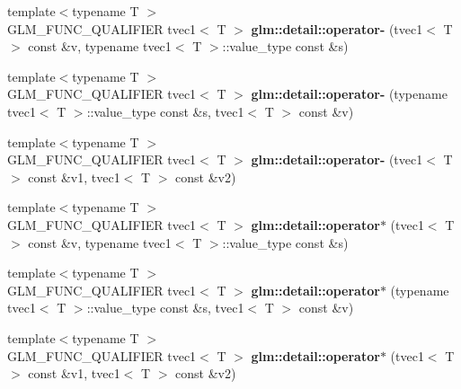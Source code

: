 \begin{DoxyCompactItemize}
\item 
\hypertarget{namespaceglm_1_1detail_a0218e4cee708b6b91e48baa5bbea5954}{{\footnotesize template$<$typename T $>$ }\\\-G\-L\-M\-\_\-\-F\-U\-N\-C\-\_\-\-Q\-U\-A\-L\-I\-F\-I\-E\-R tvec1$<$ \-T $>$ {\bfseries glm\-::detail\-::operator-\/} (tvec1$<$ \-T $>$ const \&v, typename tvec1$<$ \-T $>$\-::value\-\_\-type const \&s)}\label{namespaceglm_1_1detail_a0218e4cee708b6b91e48baa5bbea5954}

\item 
\hypertarget{namespaceglm_1_1detail_abfb3bb0f7c5149426afe27f823a7d7fa}{{\footnotesize template$<$typename T $>$ }\\\-G\-L\-M\-\_\-\-F\-U\-N\-C\-\_\-\-Q\-U\-A\-L\-I\-F\-I\-E\-R tvec1$<$ \-T $>$ {\bfseries glm\-::detail\-::operator-\/} (typename tvec1$<$ \-T $>$\-::value\-\_\-type const \&s, tvec1$<$ \-T $>$ const \&v)}\label{namespaceglm_1_1detail_abfb3bb0f7c5149426afe27f823a7d7fa}

\item 
\hypertarget{namespaceglm_1_1detail_a3343759099fcd3eda38f3faf618aeca8}{{\footnotesize template$<$typename T $>$ }\\\-G\-L\-M\-\_\-\-F\-U\-N\-C\-\_\-\-Q\-U\-A\-L\-I\-F\-I\-E\-R tvec1$<$ \-T $>$ {\bfseries glm\-::detail\-::operator-\/} (tvec1$<$ \-T $>$ const \&v1, tvec1$<$ \-T $>$ const \&v2)}\label{namespaceglm_1_1detail_a3343759099fcd3eda38f3faf618aeca8}

\item 
\hypertarget{namespaceglm_1_1detail_a4d99f64025983c46ebe26b241202369f}{{\footnotesize template$<$typename T $>$ }\\\-G\-L\-M\-\_\-\-F\-U\-N\-C\-\_\-\-Q\-U\-A\-L\-I\-F\-I\-E\-R tvec1$<$ \-T $>$ {\bfseries glm\-::detail\-::operator$\ast$} (tvec1$<$ \-T $>$ const \&v, typename tvec1$<$ \-T $>$\-::value\-\_\-type const \&s)}\label{namespaceglm_1_1detail_a4d99f64025983c46ebe26b241202369f}

\item 
\hypertarget{namespaceglm_1_1detail_a46da341cfc3cfd768914e7270ff6da80}{{\footnotesize template$<$typename T $>$ }\\\-G\-L\-M\-\_\-\-F\-U\-N\-C\-\_\-\-Q\-U\-A\-L\-I\-F\-I\-E\-R tvec1$<$ \-T $>$ {\bfseries glm\-::detail\-::operator$\ast$} (typename tvec1$<$ \-T $>$\-::value\-\_\-type const \&s, tvec1$<$ \-T $>$ const \&v)}\label{namespaceglm_1_1detail_a46da341cfc3cfd768914e7270ff6da80}

\item 
\hypertarget{namespaceglm_1_1detail_ad79aa7a83a2f742150cfa5c75bcbb5bb}{{\footnotesize template$<$typename T $>$ }\\\-G\-L\-M\-\_\-\-F\-U\-N\-C\-\_\-\-Q\-U\-A\-L\-I\-F\-I\-E\-R tvec1$<$ \-T $>$ {\bfseries glm\-::detail\-::operator$\ast$} (tvec1$<$ \-T $>$ const \&v1, tvec1$<$ \-T $>$ const \&v2)}\label{namespaceglm_1_1detail_ad79aa7a83a2f742150cfa5c75bcbb5bb}


\end{DoxyCompactItemize}
